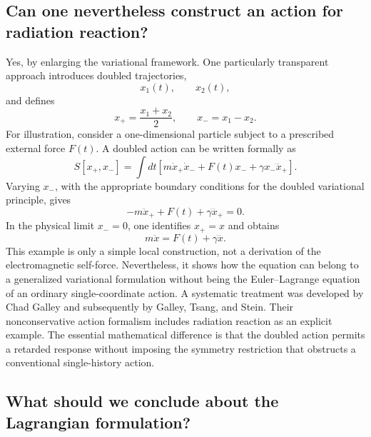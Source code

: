 \subsection{Can one nevertheless construct an action for radiation reaction?}
Yes, by enlarging the variational framework.
One particularly transparent approach introduces doubled trajectories,
\[
x_1(t),\qquad x_2(t),
\]
and defines
\[
x_+=\frac{x_1+x_2}{2},
\qquad
x_-=x_1-x_2.
\]
For illustration, consider a one-dimensional particle subject to a prescribed
external force \(F(t)\). A doubled action can be written formally as
\[
S[x_+,x_-]
=
\int dt
\left[
m\dot x_+\dot x_-
+F(t)x_-
+\gamma x_-\dddot x_+
\right].
\]
Varying \(x_-\), with the appropriate boundary conditions for the doubled
variational principle, gives
\[
-m\ddot x_+
+F(t)+\gamma\dddot x_+=0.
\]
In the physical limit \(x_-=0\), one identifies \(x_+=x\) and obtains
\[
m\ddot x=F(t)+\gamma\dddot x.
\]
This example is only a simple local construction, not a derivation of the
electromagnetic self-force. Nevertheless, it shows how the equation can belong
to a generalized variational formulation without being the Euler–Lagrange
equation of an ordinary single-coordinate action.
A systematic treatment was developed by Chad Galley and subsequently by Galley,
Tsang, and Stein. Their nonconservative action formalism includes radiation
reaction as an explicit example. 
The essential mathematical difference is that the doubled action permits a
retarded response without imposing the symmetry restriction that obstructs a
conventional single-history action.

\subsection{ What should we conclude about the Lagrangian formulation?}
 
